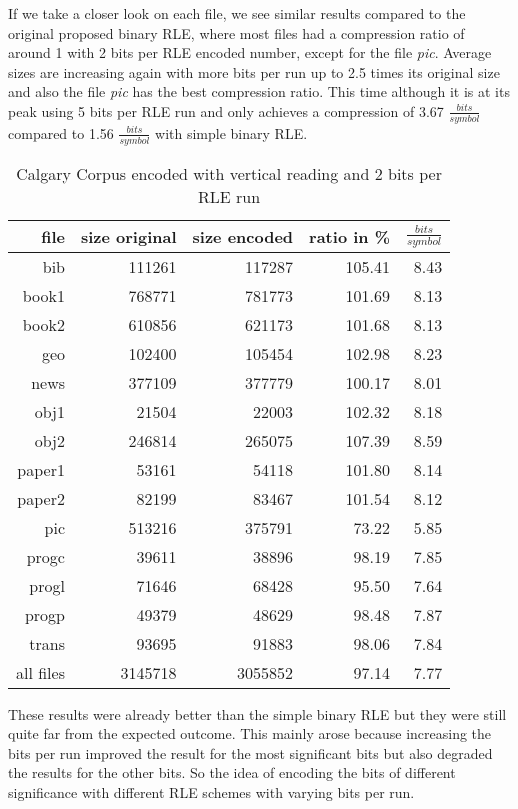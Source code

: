 \par{
If we take a closer look on each file, we see similar results compared to the original proposed binary RLE, where most files had a compression ratio of around 1 with 2 bits per RLE encoded number, except for the file \textit{pic}. Average sizes are increasing again with more bits per run up to 2.5 times its original size and also the file \textit{pic} has the best compression ratio. This time although it is at its peak using 5 bits per RLE run and only achieves a compression of 3.67 $\frac{bits}{symbol}$ compared to 1.56 $\frac{bits}{symbol}$ with simple binary RLE.

\begin{table}[H]
	\centering
	\begin{tabular}{r|r|r|r|r}	
		file & size original & size encoded & ratio in \% & $\frac{bits}{symbol}$\\
		\hline
		bib & 111261 & 117287 & 105.41 & 8.43\\
		book1 & 768771 & 781773 & 101.69 & 8.13 \\
		book2 & 610856 & 621173 & 101.68 & 8.13\\
		geo & 102400 & 105454 & 102.98 & 8.23\\
		news & 377109 & 377779 & 100.17 & 8.01\\
		obj1 & 21504 & 22003 & 102.32 & 8.18\\
		obj2& 246814 & 265075 & 107.39 & 8.59\\		 
		paper1 & 53161 & 54118 & 101.80 & 8.14\\		 
		paper2& 82199 & 83467 & 101.54 & 8.12\\		 
		pic & 513216 & 375791 & 73.22 & 5.85\\		 
		progc & 39611 & 38896 & 98.19 & 7.85\\		 
		progl & 71646 & 68428 & 95.50 & 7.64\\		 
		progp & 49379 & 48629 & 98.48 & 7.87\\		 
		trans & 93695 & 91883 & 98.06 & 7.84\\
		\hline
		all files & 3145718 & 3055852 & 97.14 & 7.77
	\end{tabular}
	\caption{Calgary Corpus encoded with vertical reading and 2 bits per RLE run}
	\label{tab:t41 Calgary Corpus encoded with vertical reading and 2 bits per RLE run}
\end{table}	
}
\par{
These results were already better than the simple binary RLE but they were still quite far from the expected outcome. This mainly arose because increasing the bits per run improved the result for the most significant bits but also degraded the results for the other bits. So the idea of encoding the bits of different significance with different RLE schemes with varying bits per run.  
}

